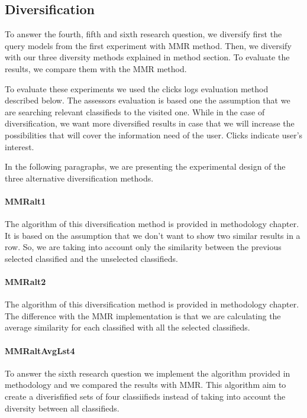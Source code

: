 \subsection{Diversification}
To answer the fourth, fifth and sixth research question, we diversify first the query models from the first experiment with MMR method. Then, we diversify with our three diversity methods explained in method section. To evaluate the results, we compare them with the MMR method.

To evaluate these experiments we used the clicks logs evaluation method described below. The assessors evaluation is based one the assumption that we are searching relevant classifieds to the visited one. While in the case of diversification, we want more diversified results in case that we will increase the possibilities that will cover the information need of the user. Clicks indicate user's interest.

In the following paragraphs, we are presenting the experimental design of the three alternative diversification methods.

 \paragraph{MMRalt1}

The algorithm of this diversification method is provided in methodology chapter. It is based on the assumption that we don't want to show two similar results in a row. So, we are taking into account only the similarity between the previous selected classified and the unselected classifieds.

 \paragraph{MMRalt2}

The algorithm of this diversification method is provided in methodology chapter. The difference with the MMR implementation is that we are calculating the average similarity for each classified with all the selected classifieds.

 \paragraph{MMRaltAvgLst4}

To answer the sixth research question we implement the algorithm provided in methodology and we compared the results with MMR. This algorithm aim to create a diverisfified sets of four classiifieds instead of taking into account the diversity between all classifieds.

